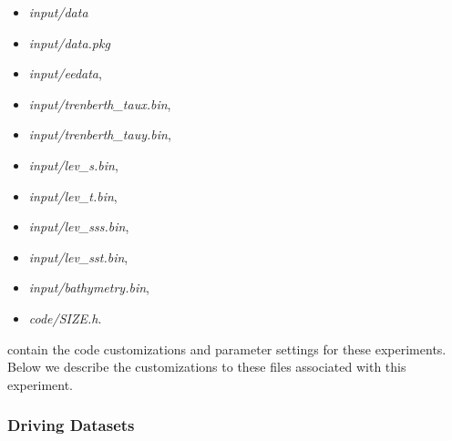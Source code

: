 \begin{itemize}
\item {\it input/data}
\item {\it input/data.pkg}
\item {\it input/eedata},
\item {\it input/trenberth\_taux.bin},
\item {\it input/trenberth\_tauy.bin},
\item {\it input/lev\_s.bin},
\item {\it input/lev\_t.bin},
\item {\it input/lev\_sss.bin},
\item {\it input/lev\_sst.bin},
\item {\it input/bathymetry.bin},
\item {\it code/SIZE.h}.
\end{itemize}
contain the code customizations and parameter settings for these
experiments. Below we describe the customizations
to these files associated with this experiment.

\subsubsection{Driving Datasets}






